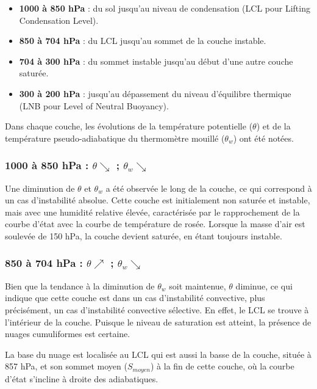 \documentclass[12pt]{article}
\begin{document}
\begin{itemize}
    \item \textbf{1000 à 850 hPa} : du sol jusqu'au niveau de condensation (LCL pour Lifting Condensation Level).
    \item \textbf{850 à 704 hPa} : du LCL jusqu'au sommet de la couche instable. 
    \item \textbf{704 à 300 hPa} : du sommet instable jusqu'au début d'une autre couche saturée. 
    \item \textbf{300 à 200 hPa} : jusqu’au dépassement du niveau d’équilibre thermique (LNB pour Level of Neutral Buoyancy).  \\  
\end{itemize}

Dans chaque couche, les évolutions de la température potentielle ($\theta$) et de la température pseudo-adiabatique du thermomètre mouillé ($\theta_w$) ont été notées.

\subsubsection*{1000 à 850 hPa : $\theta \searrow$ ; $\theta_w \searrow$ } 

Une diminution de $\theta$ et $\theta_w$ a été observée le long de la couche, ce qui correspond à un cas d'instabilité absolue. Cette couche est initialement non saturée et instable, mais avec une humidité relative élevée, caractérisée par le rapprochement de la courbe d'état avec la courbe de température de rosée. Lorsque la masse d'air est soulevée de 150 hPa, la couche devient saturée, en étant toujours instable. 

\subsubsection*{850 à 704 hPa : $\theta \nearrow$ ; $\theta_w \searrow$}

Bien que la tendance à la diminution de $\theta_w$ soit maintenue, $\theta$ diminue, ce qui indique que cette couche est dans un cas d'instabilité convective, plus précisément, un cas d'instabilité convective sélective. En effet, le LCL se trouve à l'intérieur de la couche. Puisque le niveau de saturation est atteint, la présence de nuages cumuliformes est certaine.  

La base du nuage est localisée au LCL qui est aussi la basse de la couche, située à 857 hPa, et son sommet moyen ($S_{moyen}$) à la fin de cette couche, où la courbe d'état s'incline à droite des adiabatiques. 
\end{document}
